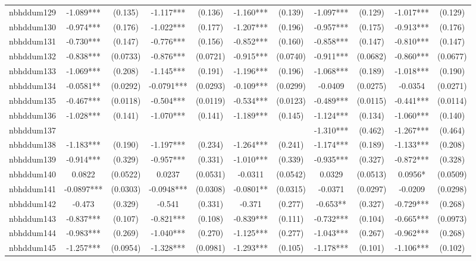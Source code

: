 \documentclass[]{article}
\begin{document}
\begin{tabular}{lcccccccccc}
nbhddum129 & -1.089*** & (0.135) & -1.117*** & (0.136) & -1.160*** & (0.139) & -1.097*** & (0.129) & -1.017*** & (0.129) \\
nbhddum130 & -0.974*** & (0.176) & -1.022*** & (0.177) & -1.207*** & (0.196) & -0.957*** & (0.175) & -0.913*** & (0.176) \\
nbhddum131 & -0.730*** & (0.147) & -0.776*** & (0.156) & -0.852*** & (0.160) & -0.858*** & (0.147) & -0.810*** & (0.147) \\
nbhddum132 & -0.838*** & (0.0733) & -0.876*** & (0.0721) & -0.915*** & (0.0740) & -0.911*** & (0.0682) & -0.860*** & (0.0677) \\
nbhddum133 & -1.069*** & (0.208) & -1.145*** & (0.191) & -1.196*** & (0.196) & -1.068*** & (0.189) & -1.018*** & (0.190) \\
nbhddum134 & -0.0581** & (0.0292) & -0.0791*** & (0.0293) & -0.109*** & (0.0299) & -0.0409 & (0.0275) & -0.0354 & (0.0271) \\
nbhddum135 & -0.467*** & (0.0118) & -0.504*** & (0.0119) & -0.534*** & (0.0123) & -0.489*** & (0.0115) & -0.441*** & (0.0114) \\
nbhddum136 & -1.028*** & (0.141) & -1.070*** & (0.141) & -1.189*** & (0.145) & -1.124*** & (0.134) & -1.060*** & (0.140) \\
nbhddum137 &  &  &  &  &  &  & -1.310*** & (0.462) & -1.267*** & (0.464) \\
nbhddum138 & -1.183*** & (0.190) & -1.197*** & (0.234) & -1.264*** & (0.241) & -1.174*** & (0.189) & -1.133*** & (0.208) \\
nbhddum139 & -0.914*** & (0.329) & -0.957*** & (0.331) & -1.010*** & (0.339) & -0.935*** & (0.327) & -0.872*** & (0.328) \\
nbhddum140 & 0.0822 & (0.0522) & 0.0237 & (0.0531) & -0.0311 & (0.0542) & 0.0329 & (0.0513) & 0.0956* & (0.0509) \\
nbhddum141 & -0.0897*** & (0.0303) & -0.0948*** & (0.0308) & -0.0801** & (0.0315) & -0.0371 & (0.0297) & -0.0209 & (0.0298) \\
nbhddum142 & -0.473 & (0.329) & -0.541 & (0.331) & -0.371 & (0.277) & -0.653** & (0.327) & -0.729*** & (0.268) \\
nbhddum143 & -0.837*** & (0.107) & -0.821*** & (0.108) & -0.839*** & (0.111) & -0.732*** & (0.104) & -0.665*** & (0.0973) \\
nbhddum144 & -0.983*** & (0.269) & -1.040*** & (0.270) & -1.125*** & (0.277) & -1.043*** & (0.267) & -0.962*** & (0.268) \\
nbhddum145 & -1.257*** & (0.0954) & -1.328*** & (0.0981) & -1.293*** & (0.105) & -1.178*** & (0.101) & -1.106*** & (0.102) \\

\end{tabular}
\end{document}
